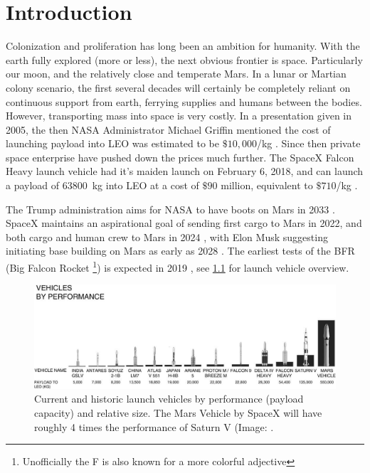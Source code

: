
\chapter{Introduction}
Colonization and proliferation has long been an ambition for humanity. With the earth fully explored (more or less), the next obvious frontier is space. Particularly our moon, and the relatively close and temperate Mars. In a lunar or Martian colony scenario, the first several decades will certainly be completely reliant on continuous support from earth, ferrying supplies and humans between the bodies. However, transporting mass into space is very costly. In a presentation given in 2005, the then NASA Administrator Michael Griffin mentioned the cost of launching payload into LEO was estimated to be $\$10,000$/kg \cite[p.~344]{Rapp2016}. Since then private space enterprise have pushed down the prices much further. The SpaceX Falcon Heavy launch vehicle had it's maiden launch on February 6, 2018, and can launch a payload of \SI{63800}{\kg} into LEO at a cost of $\$90$ million, equivalent to $\$710$/kg \cite{SpaceX}.

The Trump administration aims for NASA to have boots on Mars in 2033 \cite{Mack}. SpaceX maintains an aspirational goal of sending first cargo to Mars in 2022, and both cargo and human crew to Mars in 2024 \cite{SpaceXa}, with Elon Musk suggesting initiating base building on Mars as early as 2028 \cite{Williams}. The earliest tests of the BFR (Big Falcon Rocket \footnote{Unofficially the F is also known for a more colorful adjective}) is expected in 2019 \cite{SpaceXa}, see \cref{fig:musk-launch-vehicles} for launch vehicle overview.

\begin{figure}[ht]
	\centering
	\includegraphics[width=0.90\linewidth]{fig/musk-launch-vehicles.jpg}
	\caption{Current and historic launch vehicles by performance (payload capacity) and relative size. The Mars Vehicle by SpaceX will have roughly 4 times the performance of Saturn V (Image: \cite{Musk}.}
	\label{fig:musk-launch-vehicles}
\end{figure}

